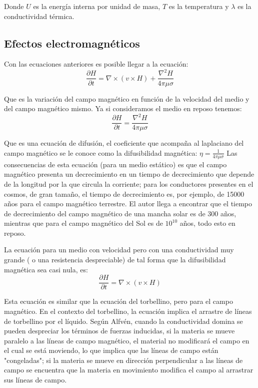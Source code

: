 Donde $U$ es la energía interna por unidad de masa, $T$ es la temperatura y $\lambda$ es la conductividad térmica.

\subsection{Efectos electromagnéticos}

Con las ecuaciones anteriores es posible llegar a la ecuación:
\begin{equation}
\frac{\partial H}{\partial t}=\nabla \times(v\times H)+\frac{\nabla^{2}H}{4\pi \mu \sigma}
\end{equation}

Que es la variación del campo magnético en función de la velocidad del medio y del campo magnético mismo. Ya si consideramos el medio en reposo tenemos:
\begin{equation}
\frac{\partial H}{\partial t}=\frac{\nabla^{2}H}{4\pi \mu \sigma}
\end{equation}

Que es una ecuación de difusión, el coeficiente que acompaña al laplaciano del campo magnético se le conoce como la difusibilidad magnética: $\eta=\frac{1}{4\pi \mu \sigma}$
Las consecuencias de esta ecuación (para un medio estático) es que el campo magnético presenta un decrecimiento en un tiempo de decrecimiento que depende de la longitud por la que circula la corriente; para los conductores presentes en el cosmos, de gran tamaño, el tiempo de decrecimiento es, por ejemplo, de 15000 años para el campo magnético terrestre. 
El autor llega a encontrar que el tiempo de decrecimiento del campo magnético de una mancha solar es de 300 años, mientras que para el campo magnético del Sol es de $10^{10}$ años, todo esto en reposo.

La ecuación para un medio con velocidad pero con una conductividad muy grande ( o una resistencia despreciable) de tal forma que la difusibilidad magnética sea casi nula, es:
\begin{equation}
\frac{\partial H}{\partial t}=\nabla \times(v\times H)
\end{equation}

Esta ecuación es similar que la ecuación del torbellino, pero para el campo magnético. En el contexto del torbellino, la ecuación implica el arrastre de líneas de torbellino por el líquido. Según Alfvén, cuando la conductividad domina se pueden despreciar los términos de fuerzas inducidas, si la materia se mueve paralelo a las líneas de campo magnético, el material no modificará el campo en el cual se está moviendo, lo que implica que las líneas de campo están "congeladas"; si la materia se mueve en dirección perpendicular a las líneas de campo se encuentra que la materia en movimiento modifica el campo al arrastrar sus líneas de campo.

